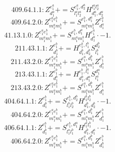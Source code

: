 \documentclass[letterpaper,10pt,fleqn,leqno,onecolumn]{article}
\begin{document}
\begin{equation} \;\;\;\;\;\;  409.64.1.1: Z^{e_{1}^{a}}_{d_{1}^{a}}+=S^{e_{1}^{a},d_{2}^{a}}_{l_{1}^{a}l_{2}^{a}}H^{l_{1}^{a}l_{2}^{a}}_{d_{1}^{a},d_{2}^{a}} \end{equation}
\begin{equation} \;\;\;\;\;\;  409.64.2.0: Z^{e_{1}^{a}e_{1}^{b}}_{m_{1}^{a}m_{1}^{b}}+=S^{e_{1}^{b},d_{1}^{a}}_{m_{1}^{a}m_{1}^{b}}Z^{e_{1}^{a}}_{d_{1}^{a}} \end{equation}
\begin{equation} \;\;\;\;\;\;  41.13.1.0: Z^{e_{1}^{a}e_{1}^{b}}_{m_{1}^{a}m_{1}^{b}}+=S^{e_{1}^{b},d_{1}^{a}}_{m_{1}^{a}m_{1}^{b}}H^{e_{1}^{a}}_{d_{1}^{a}}\cdot -1. \end{equation}
\begin{equation} \;\;\;\;\;\;  211.43.1.1: Z^{e_{1}^{b}}_{d_{1}^{b}}+=H^{e_{1}^{b},l_{1}^{b}}_{d_{1}^{b},d_{2}^{b}}S^{d_{2}^{b}}_{l_{1}^{b}} \end{equation}
\begin{equation} \;\;\;\;\;\;  211.43.2.0: Z^{e_{1}^{a}e_{1}^{b}}_{m_{1}^{a}m_{1}^{b}}+=S^{e_{1}^{a},d_{1}^{b}}_{m_{1}^{a}m_{1}^{b}}Z^{e_{1}^{b}}_{d_{1}^{b}} \end{equation}
\begin{equation} \;\;\;\;\;\;  213.43.1.1: Z^{e_{1}^{b}}_{d_{1}^{b}}+=H^{e_{1}^{b},l_{1}^{a}}_{d_{1}^{b},d_{1}^{a}}S^{d_{1}^{a}}_{l_{1}^{a}} \end{equation}
\begin{equation} \;\;\;\;\;\;  213.43.2.0: Z^{e_{1}^{a}e_{1}^{b}}_{m_{1}^{a}m_{1}^{b}}+=S^{e_{1}^{a},d_{1}^{b}}_{m_{1}^{a}m_{1}^{b}}Z^{e_{1}^{b}}_{d_{1}^{b}} \end{equation}
\begin{equation} \;\;\;\;\;\;  404.64.1.1: Z^{e_{1}^{b}}_{d_{1}^{b}}+=S^{e_{1}^{b},d_{2}^{b}}_{l_{1}^{b}l_{2}^{b}}H^{l_{1}^{b}l_{2}^{b}}_{d_{1}^{b},d_{2}^{b}}\cdot -1. \end{equation}
\begin{equation} \;\;\;\;\;\;  404.64.2.0: Z^{e_{1}^{a}e_{1}^{b}}_{m_{1}^{a}m_{1}^{b}}+=S^{e_{1}^{a},d_{1}^{b}}_{m_{1}^{a}m_{1}^{b}}Z^{e_{1}^{b}}_{d_{1}^{b}} \end{equation}
\begin{equation} \;\;\;\;\;\;  406.64.1.1: Z^{e_{1}^{b}}_{d_{1}^{b}}+=S^{e_{1}^{b},d_{1}^{a}}_{l_{1}^{a}l_{1}^{b}}H^{l_{1}^{a}l_{1}^{b}}_{d_{1}^{b},d_{1}^{a}}\cdot -1. \end{equation}
\begin{equation} \;\;\;\;\;\;  406.64.2.0: Z^{e_{1}^{a}e_{1}^{b}}_{m_{1}^{a}m_{1}^{b}}+=S^{e_{1}^{a},d_{1}^{b}}_{m_{1}^{a}m_{1}^{b}}Z^{e_{1}^{b}}_{d_{1}^{b}} \end{equation}
\end{document}

